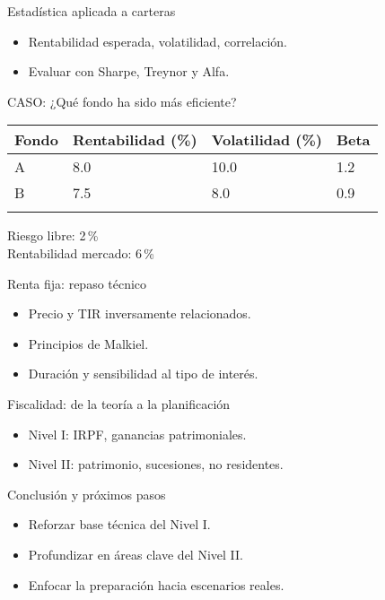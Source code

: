 \documentclass[
  ignorenonframetext,
]{beamer}
\providecommand{\tightlist}{%
  \setlength{\itemsep}{0pt}\setlength{\parskip}{0pt}}\usepackage{longtable,booktabs,array}
\begin{document}
\begin{frame}{Estadística aplicada a carteras}
\label{estaduxedstica-aplicada-a-carteras}
\begin{itemize}
\tightlist
\item
  Rentabilidad esperada, volatilidad, correlación.
\item
  Evaluar con Sharpe, Treynor y Alfa.
\end{itemize}
\end{frame}

\begin{frame}{CASO: ¿Qué fondo ha sido más eficiente?}
\label{caso-quuxe9-fondo-ha-sido-muxe1s-eficiente}
\begin{longtable}[]{@{}llll@{}}
\toprule\noalign{}
Fondo & Rentabilidad (\%) & Volatilidad (\%) & Beta \\
\midrule\noalign{}
\endhead
A & 8.0 & 10.0 & 1.2 \\
B & 7.5 & 8.0 & 0.9 \\
\bottomrule\noalign{}
\end{longtable}

Riesgo libre: 2\,\%\\
Rentabilidad mercado: 6\,\%
\end{frame}

\begin{frame}{Renta fija: repaso técnico}
\label{renta-fija-repaso-tuxe9cnico}
\begin{itemize}
\tightlist
\item
  Precio y TIR inversamente relacionados.
\item
  Principios de Malkiel.
\item
  Duración y sensibilidad al tipo de interés.
\end{itemize}
\end{frame}

\begin{frame}{Fiscalidad: de la teoría a la planificación}
\label{fiscalidad-de-la-teoruxeda-a-la-planificaciuxf3n}
\begin{itemize}
\tightlist
\item
  Nivel I: IRPF, ganancias patrimoniales.
\item
  Nivel II: patrimonio, sucesiones, no residentes.
\end{itemize}
\end{frame}

\begin{frame}{Conclusión y próximos pasos}
\label{conclusiuxf3n-y-pruxf3ximos-pasos}
\begin{itemize}
\tightlist
\item
  Reforzar base técnica del Nivel I.
\item
  Profundizar en áreas clave del Nivel II.
\item
  Enfocar la preparación hacia escenarios reales.
\end{itemize}
\end{frame}
\end{document}
